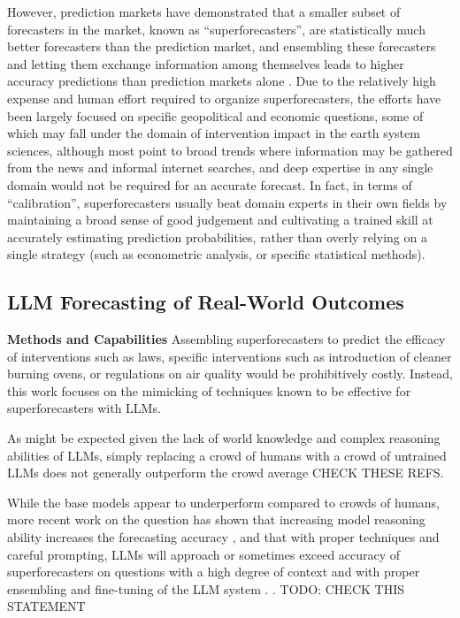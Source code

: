 \documentclass[12pt,a4paper]{article}
\begin{document}
However, prediction markets have demonstrated that a smaller subset of forecasters in the market, known as ``superforecasters'', are statistically much better forecasters than the prediction market, and ensembling these forecasters and letting them exchange information among themselves leads to higher accuracy predictions than prediction markets alone . Due to the relatively high expense and human effort required to organize superforecasters, the efforts have been largely focused on specific geopolitical and economic questions, some of which may fall under the domain of intervention impact in the earth system sciences, although most point to broad trends where information may be gathered from the news and informal internet searches, and deep expertise in any single domain would not be required for an accurate forecast. In fact, in terms of ``calibration'', superforecasters usually beat domain experts in their own fields by maintaining a broad sense of good judgement and cultivating a trained skill at accurately estimating prediction probabilities, rather than overly relying on a single strategy (such as econometric analysis, or specific statistical methods).

\subsection{LLM Forecasting of Real-World Outcomes}

\textbf{Methods and Capabilities}
Assembling superforecasters to predict the efficacy of interventions such as laws, specific interventions such as introduction of cleaner burning ovens, or regulations on air quality would be prohibitively costly. Instead, this work focuses on the mimicking of techniques known to be effective for superforecasters with LLMs. 

As might be expected given the lack of world knowledge and complex reasoning abilities of LLMs, simply replacing a crowd of humans with a crowd of untrained LLMs does not generally outperform the crowd average   CHECK THESE REFS.

While the base models appear to underperform compared to crowds of humans, more recent work on the question has shown that increasing model reasoning ability increases the forecasting accuracy , and that with proper techniques and careful prompting, LLMs will approach or sometimes exceed accuracy of superforecasters on questions with a high degree of context and with proper ensembling and fine-tuning of the LLM system .   .  TODO: CHECK THIS STATEMENT
\end{document}
